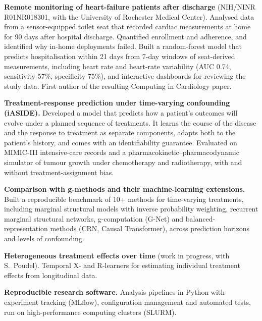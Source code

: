 \documentclass[10pt, letterpaper]{article}
\begin{document}
    \vspace{0.10 cm}
    \begin{onecolentry}
        \begin{highlights}
            \item \textbf{Remote monitoring of heart-failure patients after discharge} (NIH/NINR R01NR018301, with
            the University of Rochester Medical Center). Analysed data from a sensor-equipped toilet seat that
            recorded cardiac measurements at home for 90 days after hospital discharge. Quantified enrollment and
            adherence, and identified why in-home deployments failed. Built a random-forest model that predicts
            hospitalisation within 21 days from 7-day windows of seat-derived measurements, including heart rate
            and heart-rate variability (AUC 0.74, sensitivity 57\%, specificity 75\%), and interactive dashboards
            for reviewing the study data. First author of the resulting Computing in Cardiology paper.
            \item \textbf{Treatment-response prediction under time-varying confounding (iASIDE).} Developed a model
            that predicts how a patient's outcomes will evolve under a planned sequence of treatments. It learns
            the course of the disease and the response to treatment as separate components, adapts both to the
            patient's history, and comes with an identifiability guarantee. Evaluated on MIMIC-III intensive-care
            records and a pharmacokinetic--pharmacodynamic simulator of tumour growth under chemotherapy and
            radiotherapy, with and without treatment-assignment bias.
            \item \textbf{Comparison with g-methods and their machine-learning extensions.} Built a reproducible
            benchmark of 10+ methods for time-varying treatments, including marginal structural models with
            inverse probability weighting, recurrent marginal structural networks, g-computation (G-Net) and
            balanced-representation methods (CRN, Causal Transformer), across prediction horizons and levels of
            confounding.
            \item \textbf{Heterogeneous treatment effects over time} (work in progress, with S.\ Poudel). Temporal
            X- and R-learners for estimating individual treatment effects from longitudinal data.
            \item \textbf{Reproducible research software.} Analysis pipelines in Python with experiment tracking
            (MLflow), configuration management and automated tests, run on high-performance computing clusters
            (SLURM).
        \end{highlights}
    \end{onecolentry}
\end{document}
